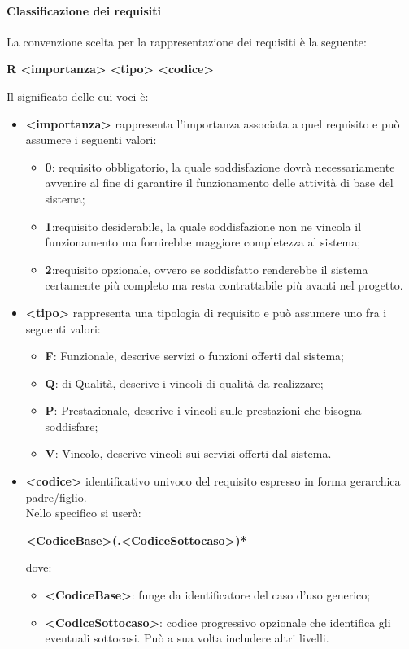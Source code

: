 			\paragraph{Classificazione dei requisiti}
				La convenzione scelta per la rappresentazione dei requisiti è la seguente:\\
				\begin{center}
					\textbf{R <importanza> <tipo> <codice>}
				\end{center}
				Il significato delle cui voci è:
				\begin{itemize}
					\item\textbf{<importanza>} rappresenta l’importanza associata a quel requisito e può assumere i seguenti valori:
						\begin{itemize}
							\item\textbf{0}: requisito obbligatorio, la quale soddisfazione dovrà necessariamente avvenire al fine di garantire il funzionamento delle attività di base del sistema;
							\item\textbf{1}:requisito desiderabile, la quale soddisfazione non ne vincola il funzionamento ma fornirebbe maggiore completezza al sistema;
							\item\textbf{2}:requisito opzionale, ovvero se soddisfatto renderebbe il sistema certamente più completo ma resta contrattabile più avanti nel progetto.
						\end{itemize}
					\item\textbf{<tipo>} rappresenta una tipologia di requisito e può assumere uno fra i seguenti valori:
						\begin{itemize}
							\item\textbf{F}: Funzionale, descrive servizi o funzioni offerti dal sistema;
							\item\textbf{Q}: di Qualità, descrive i vincoli di qualità da realizzare;
							\item\textbf{P}: Prestazionale, descrive i vincoli sulle prestazioni che bisogna soddisfare;
							\item\textbf{V}: Vincolo, descrive vincoli sui servizi offerti dal sistema.
						\end{itemize}
						
						
					\item\textbf{<codice>} identificativo univoco del requisito espresso in forma gerarchica padre/figlio. \\
						Nello specifico si userà:\\
						\begin{center}
							\textbf{<CodiceBase>(.<CodiceSottocaso>)*}
						\end{center}
						dove:
						\begin{itemize}
							\item\textbf{<CodiceBase>}: funge da identificatore del caso d’uso generico;
							\item\textbf{<CodiceSottocaso>}: codice progressivo opzionale che identifica gli eventuali sottocasi. Può a sua volta includere altri livelli.
						\end{itemize}
				\end{itemize}
